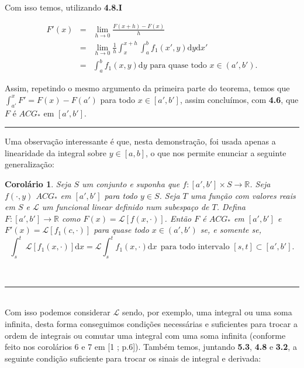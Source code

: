 \documentclass[12pt, a4paper]{article}
\newtheorem{cor}[mydef]{Corolário}
\def\eop{\hfill\rule{2.5mm}{2.5mm}}
\theoremstyle{definition}
\begin{document}
Com isso temos, utilizando \textbf{4.8.I} 

$$\begin{array}{lll}

 F'(x) & = & \displaystyle\lim_{h\rightarrow 0}\displaystyle\frac{F(x+h)-F(x)}{h}  \\
\ & = & \displaystyle\lim_{h\rightarrow 0} \displaystyle\frac{1}{h} \displaystyle\int_x^{x+h}\int_a^b f_1(x',y) \text{d}y  \text{d}x' \\
\ & = & \displaystyle\int_a^b f_1(x,y)  \text{d}y \text{ para quase todo } x\in (a', b').
\end{array}$$

Assim, repetindo o mesmo argumento da primeira parte do teorema, temos que $\int_{a'}^x F'=F(x)-F(a')$ para todo $x\in [a', b']$, assim concluímos, com \textbf{4.6}, que $F$ é $ACG_*$ em $[a', b']$. \eop

Uma observação interessante é que, nesta demonstração, foi usada apenas a linearidade da integral sobre $y\in [a,b]$, o que nos permite enunciar a seguinte generalização: 

\begin{cor}
	
	Seja $S$ um conjunto e suponha que $f:[a',b']\times S \rightarrow \mathbb{R}$. Seja $f(\cdot , y)$ $ACG_*$ em $[a', b']$ para todo $y\in S$. Seja $T$ uma função com valores reais em $S$ e $\mathcal{L}$ um funcional linear definido num subespaço de $T$. Defina $F:[a' ,b']\rightarrow \mathbb{R}$ como $F(x)=\mathcal{L}[f(x,\cdot)]$. Então $F$ é $ACG_*$ em $[a', b']$ e $F'(x)=\mathcal{L}[f_1(c,\cdot)]$ para quase todo $x\in (a', b')$ se, e somente se, $$\int_s^t\ \mathcal{L}[ f_1(x,\cdot)]  \text{d}x=\mathcal{L}\int_s^t f_1(x,\cdot) \text{d}x \ \ \text{para todo intervalo }[s,t]\subset [a',b'].$$
	
\end{cor}

\ \eop \\

Com isso podemos considerar $\mathcal{L}$ sendo, por exemplo, uma integral ou uma soma infinita, desta forma conseguimos condições necessárias e suficientes para trocar a ordem de integrais ou comutar uma integral com uma soma infinita (conforme feito nos corolários 6 e 7 em [1 ; p.6]). 
Também temos, juntando \textbf{5.3}, \textbf{4.8} e \textbf{3.2}, a seguinte condição suficiente para trocar os sinais de integral e derivada: 
\end{document}
